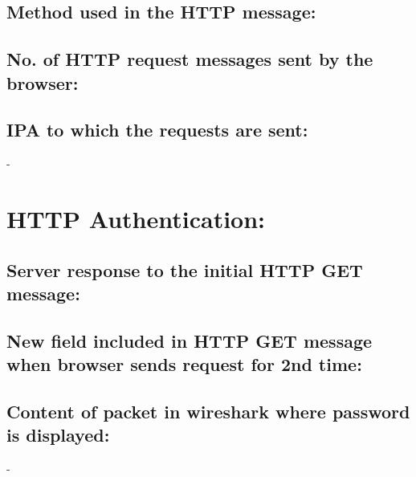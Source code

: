 \documentclass[]{report}
\begin{document}
\subsection{Method used in the HTTP message:}

\subsection{No. of HTTP request messages sent by the browser:}

\subsection{IPA to which the requests are sent:}
-


\section{HTTP Authentication:}
\subsection{Server response to the initial HTTP GET message:}

\subsection{New field included in HTTP GET message when browser sends request for 2nd time:}

\subsection{Content of packet in wireshark where password is displayed:}
-
\end{document}
